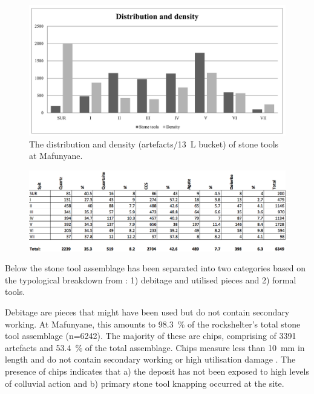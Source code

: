 	\begin{figure} %
		\includegraphics[width=\linewidth]{figures/Forssman-Figure04}
		\caption{The distribution and density (artefacts/\SI{13}{\liter} bucket) of stone tools at Mafunyane.}
		\label{fig:Forssman-Figure04}
	\end{figure}

	\begin{figure} %
		\includegraphics[width=\linewidth]{figures/Forssman-Table02}
		\label{fig:Forssman-Table02}
	\end{figure}

Below the stone tool assemblage has been separated into two categories based on the typological breakdown from \textcite{Walker_1994}: 1) debitage and utilised pieces and 2) formal tools.

Debitage are  pieces that might have been used but do not contain secondary working. 
At Mafunyane, this amounts to \SI{98.3}{\percent} of the rockshelter’s total stone tool assemblage (n=\num{6242}). 
The majority of these are chips, comprising of \num{3391} artefacts and \SI{53.4}{\percent} of the total assemblage. 
Chips measure less than \SI{10}{\milli\meter}
  in length and do not contain secondary working or high utilisation damage \parencite[see][]{Deacon_1984a}. 
 The presence of chips indicates that a) the deposit has not been exposed to high levels of colluvial action \parencite{Kuman_2009} and b) primary stone tool knapping occurred at the site.

